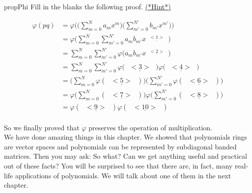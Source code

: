 \begin{exercise}{propPhi}
Fill in the blanks the following proof. \hyperref[sec:PolyVec:hints]{(*Hint*)} 

\begin{align*}
\varphi(pq) &= \varphi\Bigg(\Big(\sum^ {N}_{m=0} a_{m}x^{m}\Big)\Big( \sum^{N'}_{m'=0} b_{m'}x^{m'}\Big)\Bigg)\\
&= \varphi\Bigg(\sum^ {N}_{m=0}\sum^{N'}_{m'=0} a_{m}b_{m'} x^{\underline{\text{ $<1>$ }}} \Bigg)\\
&= \sum^ {N}_{m=0}\sum^{N'}_{m'=0}\varphi\big( a_{m}b_{m'} x^{\underline{\text{ $<2>$ }}} \big)\\
&= \sum^ {N}_{m=0}\sum^{N'}_{m'=0}\varphi\big( \underline{\text{ $<3>$ }} \big)\varphi\big(\underline{\text{ $<4>$ }}\big)\\
&= \Big(\sum^ {N}_{m=0}\varphi(\underline{\text{ $<5>$ }})\Big)\Big( \sum^{N'}_{m'=0}\varphi(\underline{\text{ $<6>$ }})\Big)\\
&= \varphi \Big(\sum^ {N}_{m=0}(\underline{\text{ $<7>$ }})\Big)\varphi\Big( \sum^{N'}_{m'=0}(\underline{\text{ $<8>$ }})\Big)\\
&= \varphi(\underline{\text{ $<9>$ }}) \varphi(\underline{\text{ $<10>$ }})\\
\end{align*}
\end{exercise}

So we finally proved that $\varphi$ preserves the operation of multiplication.\\

We have done amazing things in this chapter. We showed that polynomials rings are vector spaces and polynomials can be represented by subdiagonal banded matrices. Then you may ask: So what? Can we get anything useful and practical out of these facts? You will be surprised to see that there are, in fact, many real-life applications of polynomials. We will talk about one of them in the next chapter.
